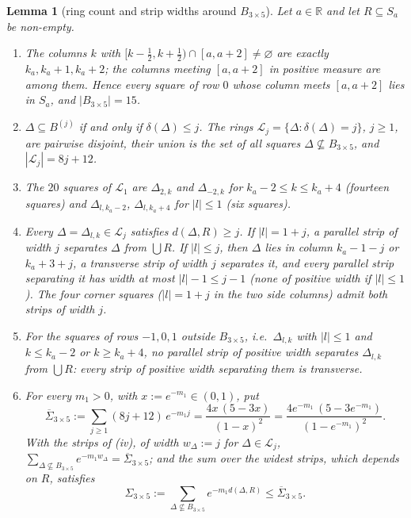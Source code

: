 \documentclass[11pt,a4paper]{article}
\theoremstyle{plain}
\theoremstyle{definition}
\theoremstyle{plain}
\newtheorem{auxlemma}{Lemma}
\theoremstyle{definition}
\newcommand{\R}{\mathbb{R}}
\begin{document}
\begin{auxlemma}[ring count and strip widths around $B_{3\times5}$]\label{aux:notation-rings}
Let $a\in\R$ and let $R\subseteq S_a$ be non-empty.
\begin{enumerate}
\item[\textup{(i)}] The columns $k$ with $[k-\frac12,k+\frac12)\cap[a,a+2]\ne\varnothing$ are
exactly $k_a,k_a+1,k_a+2$; the columns meeting $[a,a+2]$ in positive measure are among
them.  Hence every square of row $0$ whose column meets $[a,a+2]$ lies in $S_a$, and
$|B_{3\times5}|=15$.
\item[\textup{(ii)}] $\Delta\subseteq B^{(j)}$ if and only if $\delta(\Delta)\le j$.  The rings
$\mathcal L_j=\{\Delta:\delta(\Delta)=j\}$, $j\ge1$, are pairwise disjoint, their union is
the set of all squares $\Delta\not\subseteq B_{3\times5}$, and $|\mathcal L_j|=8j+12$.
\item[\textup{(iii)}] The $20$ squares of $\mathcal L_1$ are $\Delta_{2,k}$ and $\Delta_{-2,k}$
for $k_a-2\le k\le k_a+4$ (fourteen squares) and $\Delta_{l,k_a-2}$, $\Delta_{l,k_a+4}$ for
$|l|\le1$ (six squares).
\item[\textup{(iv)}] Every $\Delta=\Delta_{l,k}\in\mathcal L_j$ satisfies $d(\Delta,R)\ge j$.  If
$|l|=1+j$, a parallel strip of width $j$ separates $\Delta$ from $\bigcup R$.  If $|l|\le j$,
then $\Delta$ lies in column $k_a-1-j$ or $k_a+3+j$, a transverse strip of width $j$
separates it, and every parallel strip separating it has width at most $|l|-1\le j-1$ (none
of positive width if $|l|\le1$).  The four corner squares ($|l|=1+j$ in the two side
columns) admit both strips of width $j$.
\item[\textup{(v)}] For the squares of rows $-1,0,1$ outside $B_{3\times5}$, i.e.\
$\Delta_{l,k}$ with $|l|\le1$ and $k\le k_a-2$ or $k\ge k_a+4$, no parallel strip of positive
width separates $\Delta_{l,k}$ from $\bigcup R$: every strip of positive width separating
them is transverse.
\item[\textup{(vi)}] For every $m_1>0$, with $x:=e^{-m_1}\in(0,1)$, put
\[
 \overline\Sigma_{3\times5}:=\sum_{j\ge1}(8j+12)\,e^{-m_1j}=\frac{4x\,(5-3x)}{(1-x)^2}
 =\frac{4e^{-m_1}\,(5-3e^{-m_1})}{(1-e^{-m_1})^2} .
\]
With the strips of \textup{(iv)}, of width $w_\Delta:=j$ for $\Delta\in\mathcal L_j$,
$\sum_{\Delta\not\subseteq B_{3\times5}}e^{-m_1w_\Delta}=\overline\Sigma_{3\times5}$; and the sum
over the widest strips, which depends on $R$, satisfies
\[
 \Sigma_{3\times5}:=\sum_{\Delta\not\subseteq B_{3\times5}}e^{-m_1d(\Delta,R)}
 \le\overline\Sigma_{3\times5} .
\]
\end{enumerate}
\end{auxlemma}
\end{document}
